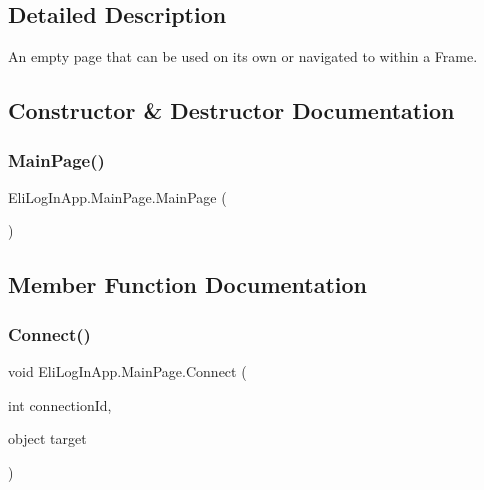 \subsection{Detailed Description}
An empty page that can be used on its own or navigated to within a Frame. 



\subsection{Constructor \& Destructor Documentation}
\mbox{\label{class_eli_log_in_app_1_1_main_page_a808b295c704ccd3b5172171b32780f4f}} 
\subsubsection{\texorpdfstring{Main\+Page()}{MainPage()}}
{\footnotesize\ttfamily Eli\+Log\+In\+App.\+Main\+Page.\+Main\+Page (\begin{DoxyParamCaption}{ }\end{DoxyParamCaption})\hspace{0.3cm}{\ttfamily [inline]}}



\subsection{Member Function Documentation}
\mbox{\label{class_eli_log_in_app_1_1_main_page_a91b51a574c226bfbec61f7deaba558e9}} 
\subsubsection{\texorpdfstring{Connect()}{Connect()}\hspace{0.1cm}{\footnotesize\ttfamily [1/3]}}
{\footnotesize\ttfamily void Eli\+Log\+In\+App.\+Main\+Page.\+Connect (\begin{DoxyParamCaption}\item[{int}]{connection\+Id,  }\item[{object}]{target }\end{DoxyParamCaption})\hspace{0.3cm}{\ttfamily [inline]}}



